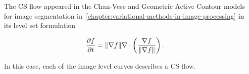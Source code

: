 The CS flow appeared in the Chan-Vese and Geometric Active Contour models for image segmentation in~\cref{chapter:variational-methods-in-image-processing} in its level set formulation~\cite{osher88fronts}

\begin{align}
	\frac{\partial f}{\partial t} &= \lVert\nabla f\rVert\nabla \cdot \left( \frac{\nabla f}{\lVert\nabla f\rVert} \right).
	\label{ch3:eq:implicit-curvature-flow}
\end{align}

In this case, each of the image level curves describes a CS flow.

\begin{figure}
\center
{}\hspace{1em}
\hspace{1em}

\end{figure}
